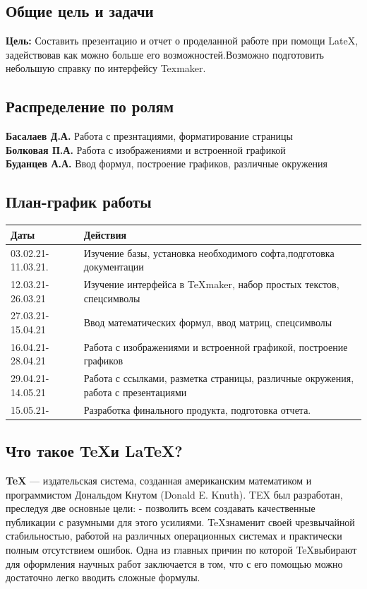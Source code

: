 \documentclass[14pt, a4paper]{extarticle}
\begin{document}
\subsection{Общие цель и задачи}
\textbf{Цель:} Составить презентацию и отчет о проделанной работе при помощи LateX, задействовав как можно больше его возможностей.Возможно подготовить небольшую справку по интерфейсу Texmaker.
\subsection{Распределение по ролям}
\textbf{Басалаев Д.А.} Работа с презнтациями, форматирование страницы\\
\textbf{Болковая П.А.} Работа с изображениями и встроенной графикой\\
\textbf{Буданцев А.А.} Ввод формул, построение графиков, различные окружения
\subsection{План-график работы}
\begin{tabular}{| l| p{13cm}|}
\hline {\bfseries \large Даты} & {\bfseries \large Действия}\\ \hline
03.02.21-11.03.21. & Изучение базы, установка необходимого софта,подготовка документации\\ \hline
12.03.21-26.03.21 & Изучение интерфейса в \TeX maker, набор простых текстов, спецсимволы \\ \hline
27.03.21-15.04.21 & Ввод математических формул, ввод матриц, спецсимволы  \\ \hline
16.04.21-28.04.21 & Работа с изображениями и встроенной графикой, построение графиков \\ \hline 
29.04.21-14.05.21 & Работа с ссылками, разметка страницы, различные окружения, работа с презентациями \\ \hline
15.05.21- & Разработка финального продукта, подготовка отчета. \\ \hline
\end{tabular}
\subsection{Что такое \TeX и \LaTeX ?}
\textbf{\TeX} — издательская система, созданная американским математиком и программистом Дональдом Кнутом (Donald E. Knuth). TEX был разработан, преследуя две основные цели: - позволить всем создавать качественные публикации с разумными для этого усилиями. \TeX знаменит своей чрезвычайной стабильностью, работой на различных операционных системах и практически полным отсутствием ошибок. Одна из главных причин по которой \TeX выбирают для оформления научных работ заключается в том, что с его помощью можно достаточно легко вводить сложные формулы.\\
\end{document}
